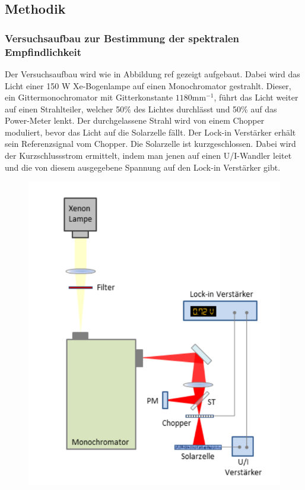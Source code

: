 
\subsection{Methodik}

\subsubsection{Versuchsaufbau zur Bestimmung der spektralen Empfindlichkeit}

Der Versuchsaufbau wird wie in Abbildung ref gezeigt aufgebaut. Dabei wird das Licht einer 150 W Xe-Bogenlampe auf einen Monochromator gestrahlt. 
Dieser, ein Gittermonochromator mit Gitterkonstante $1180 \mathrm{mm}^{-1}$, führt das Licht weiter auf einen Strahlteiler, welcher 50\% des Lichtes 
durchlässt und 50\% auf das Power-Meter lenkt. Der durchgelassene Strahl wird von einem Chopper moduliert, bevor das Licht auf die Solarzelle 
fällt. Der Lock-in Verstärker erhält sein Referenzsignal vom Chopper. Die Solarzelle ist kurzgeschlossen. Dabei wird der Kurzschlussstrom ermittelt, indem 
man jenen auf einen U/I-Wandler leitet und die von diesem ausgegebene Spannung auf den Lock-in Verstärker gibt. 

\begin{figure}
    \centering
    \includegraphics[]{Bilder/Versuchsaufbau1.png}
\end{figure}


